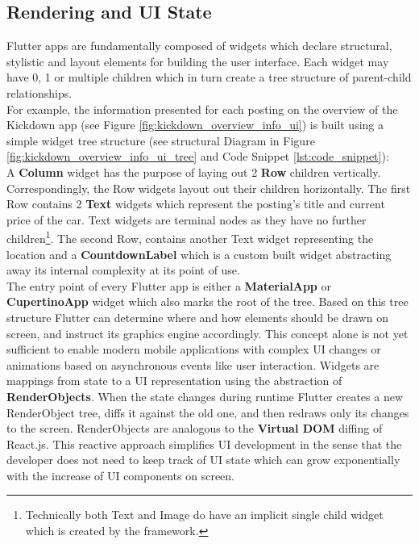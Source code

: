 \subsection{Rendering and UI State} \label{subsection::rendering_ui_state}
Flutter apps are fundamentally composed of widgets which declare structural, stylistic and layout elements for building the user interface. 
Each widget may have 0, 1 or multiple children which in turn create a tree structure of parent-child relationships. \\
For example, the information presented for each posting on the overview of the Kickdown app (see Figure \ref{fig:kickdown_overview_info_ui}) is built using a simple widget tree structure (see structural Diagram in Figure \ref{fig:kickdown_overview_info_ui_tree} and Code Snippet \ref{lst:code_snippet}):\\
A \textbf{Column} widget has the purpose of laying out 2 \textbf{Row} children vertically. Correspondingly, the Row widgets layout out their children horizontally. 
The first Row contains 2 \textbf{Text} widgets which represent the posting's title and current price of the car. 
Text widgets are terminal nodes as they have no further children\footnote{Technically both Text and Image do have an implicit single child widget which is created by the framework.}.
The second Row, contains another Text widget representing the location and a \textbf{CountdownLabel} which is a custom built widget abstracting away its internal complexity at its point of use.\\
The entry point of every Flutter app is either a \textbf{MaterialApp} or \textbf{CupertinoApp} widget which also marks the root of the tree.
Based on this tree structure Flutter can determine where and how elements should be drawn on screen, and instruct its graphics engine accordingly.
This concept alone is not yet sufficient to enable modern mobile applications with complex UI changes or animations 
based on asynchronous events like user interaction. 
Widgets are mappings from state to a UI representation using the abstraction of \textbf{RenderObjects}. When the state changes during runtime Flutter creates a new RenderObject tree, 
diffs it against the old one, and then redraws only its changes to the screen.
RenderObjects are analogous to the \textbf{Virtual DOM} diffing of React.js.
This reactive approach simplifies UI development in the sense that the developer does not need to keep track of UI state which can grow exponentially
with the increase of UI components on screen. 

